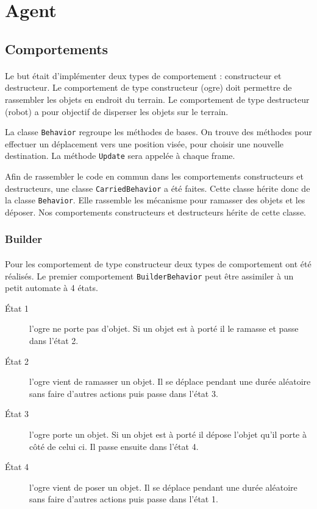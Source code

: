 \section{Agent}

\subsection{Comportements}
\paragraph{}Le but était d'implémenter deux types de comportement :
constructeur et destructeur. Le
comportement de type constructeur (ogre) doit permettre de rassembler les objets
en endroit du terrain. Le comportement de type destructeur (robot) a pour
objectif de disperser les objets sur le terrain.

La classe \texttt{Behavior} regroupe les méthodes de bases. On trouve des
méthodes pour effectuer un déplacement vers une position visée, pour choisir
une nouvelle destination. La méthode \texttt{Update} sera appelée à chaque frame.

Afin de rassembler le code en commun dans les comportements constructeurs et
destructeurs, une classe \texttt{CarriedBehavior} a été faites. Cette classe
hérite donc de la classe \texttt{Behavior}.  Elle rassemble les mécanisme pour
ramasser des objets et les déposer. Nos comportements constructeurs et destructeurs 
hérite de cette classe.


\subsubsection{Builder}
\paragraph{}Pour les comportement de type constructeur deux types de comportement ont été
réalisés. Le premier comportement \texttt{BuilderBehavior} peut être assimiler à un petit automate à 4 états.


\begin{description}
    \item[\'Etat 1] l'ogre ne porte pas d'objet. Si un objet est à porté il
        le ramasse et passe dans l'état 2.
    \item[\'Etat 2] l'ogre vient de ramasser un objet. Il se déplace pendant une
        durée aléatoire sans faire d'autres actions puis passe dans l'état 3.
    \item[\'Etat 3] l'ogre porte un objet. Si un objet est à porté il
        dépose l'objet qu'il porte à côté de celui ci. Il passe ensuite dans
        l'état 4.
    \item[\'Etat 4] l'ogre vient de poser un objet. Il se déplace pendant une
        durée aléatoire sans faire d'autres actions puis passe dans l'état 1.
\end{description}

